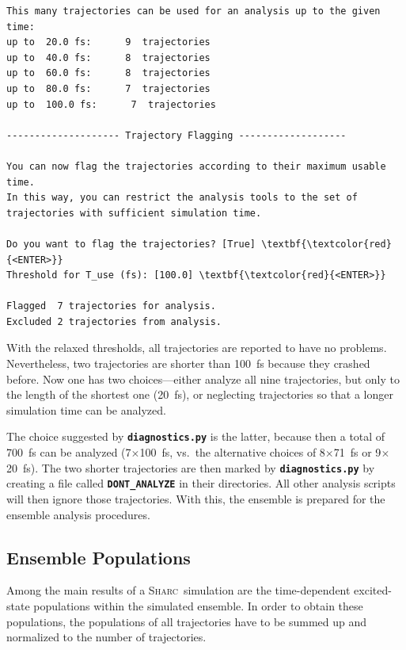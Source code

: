\documentclass[a4paper,11pt,DIV=15,openany]{scrbook}
\makeatletter
\newcommand{\refermanual}[2][rectangle,draw=B,thick,fill=black!5,inner sep=1pt,outer sep=0pt,rounded corners]{\marginpar{\tikz[baseline=(current bounding box.north)]\node at (0,0) [#1]{\begin{tabular}{@{}l@{}}See\\ section\\ \ref*{#2}\\ (p. \pageref*{#2})\\ in the\\ manual.\end{tabular}};}}
\newcommand{\sharc}{\textsc{Sharc}}
\newcommand{\ttt}[1]{\textbf{\texttt{#1}}}
\makeatother
\begin{document}
\begin{oframed}
\begin{Verbatim}[commandchars=\\\{\}]
This many trajectories can be used for an analysis up to the given time:
up to  20.0 fs:      9  trajectories
up to  40.0 fs:      8  trajectories
up to  60.0 fs:      8  trajectories
up to  80.0 fs:      7  trajectories
up to  100.0 fs:      7  trajectories

-------------------- Trajectory Flagging -------------------

You can now flag the trajectories according to their maximum usable time.
In this way, you can restrict the analysis tools to the set of trajectories with sufficient simulation time.

Do you want to flag the trajectories? [True] \textbf{\textcolor{red}{<ENTER>}}
Threshold for T_use (fs): [100.0] \textbf{\textcolor{red}{<ENTER>}}

Flagged  7 trajectories for analysis.
Excluded 2 trajectories from analysis.
\end{Verbatim}
\end{oframed}

\normalsize

With the relaxed thresholds, all trajectories are reported to have no problems.
Nevertheless, two trajectories are shorter than 100~fs because they crashed before.
Now one has two choices---either analyze all nine trajectories, but only to the length of the shortest one (20~fs), or neglecting trajectories so that a longer simulation time can be analyzed.

The choice suggested by \ttt{diagnostics.py} is the latter, because then a total of 700~fs can be analyzed (7$\times$100~fs, vs.\ the alternative choices of 8$\times$71~fs or 9$\times$20~fs).
The two shorter trajectories are then marked by \ttt{diagnostics.py} by creating a file called \ttt{DONT\_ANALYZE} in their directories.
All other analysis scripts will then ignore those trajectories.
With this, the ensemble is prepared for the ensemble analysis procedures.








\clearpage
\subsection{Ensemble Populations}
\refermanual{m-sec:populations.py}

Among the main results of a \sharc\ simulation are the time-dependent excited-state populations within the simulated ensemble. 
In order to obtain these populations, the populations of all trajectories have to be summed up and normalized to the number of trajectories.
\end{document}

